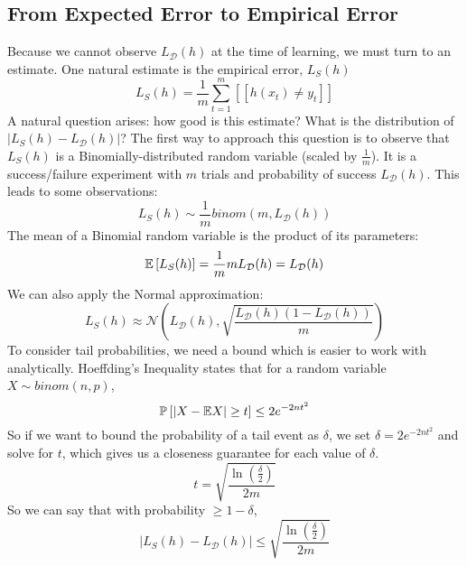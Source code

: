\documentclass{article}
\newcommand{\p}{\mathbb{P}}
\newcommand{\D}{\mathcal{D}}
\begin{document}
\subsection{From Expected Error to Empirical Error}
  Because we cannot observe $L_\D (h)$ at the time of learning, we must turn to
  an estimate. One natural estimate is the empirical error, $L_S (h)$
  $$L_S(h) = \frac{1}{m} \sum_{t = 1}^m \left[ [ h(x_t) \neq y_t] \right]$$
  A natural question arises: how good is this estimate? What is the distribution
  of $|L_S(h) - L_\D(h)|$?
  The first way to approach this question is to observe that $L_S(h)$ is a
  Binomially-distributed random variable (scaled by $\frac{1}{m}$). It is a
  success/failure experiment with $m$ trials and probability of success
  $L_\D(h)$. This leads to some observations:
  $$L_S(h) \sim \frac{1}{m} binom(m, L_\D(h))$$
  The mean of a Binomial random variable is the product of its parameters:
  $$\E\left[ L_S(h) \right] = \frac{1}{m} m L_\D(h) = L_\D(h)$$
  We can also apply the Normal approximation:
  $$L_S(h) \approx \mathcal{N}\left(L_\D(h), \sqrt{\frac{L_\D(h)(1 - L_\D(h))}{m}}
  \right)$$
  To consider tail probabilities, we need a bound which is easier to work with
  analytically. Hoeffding's Inequality states that for a random variable
  $X \sim binom(n,p)$,
  $$\p\left[|X - \E X| \geq t \right] \leq 2e^{-2nt^2}$$
  So if we want to bound the probability of a tail event as $\delta$, we set
  $\delta = 2e^{-2nt^2}$ and solve for $t$, which gives us a
  closeness guarantee for each value of $\delta$.
  $$ t = \sqrt{\frac{\ln \left(\frac{\delta}{2}\right)}{2m}} $$
  So we can say that with probability $\geq 1 - \delta$,
  $$|L_S(h) - L_\D(h)| \leq \sqrt{\frac{\ln \left(\frac{\delta}{2}\right)}{2m}}$$
\end{document}
